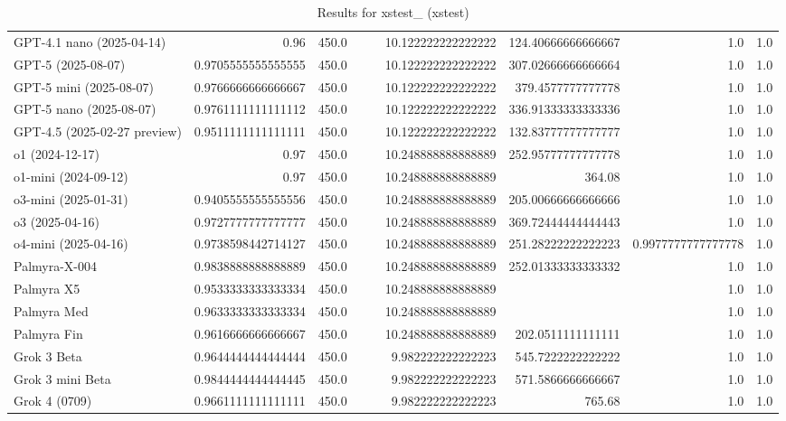 \begin{table}[htp]
{\begin{tabular}{lrrrrrrrr}
GPT-4.1 nano (2025-04-14) & 0.96 & 450.0 &  &  & 10.122222222222222 & 124.40666666666667 & 1.0 & 1.0 \\
GPT-5 (2025-08-07) & 0.9705555555555555 & 450.0 &  &  & 10.122222222222222 & 307.02666666666664 & 1.0 & 1.0 \\
GPT-5 mini (2025-08-07) & 0.9766666666666667 & 450.0 &  &  & 10.122222222222222 & 379.4577777777778 & 1.0 & 1.0 \\
GPT-5 nano (2025-08-07) & 0.9761111111111112 & 450.0 &  &  & 10.122222222222222 & 336.91333333333336 & 1.0 & 1.0 \\
GPT-4.5 (2025-02-27 preview) & 0.9511111111111111 & 450.0 &  &  & 10.122222222222222 & 132.83777777777777 & 1.0 & 1.0 \\
o1 (2024-12-17) & 0.97 & 450.0 &  &  & 10.248888888888889 & 252.95777777777778 & 1.0 & 1.0 \\
o1-mini (2024-09-12) & 0.97 & 450.0 &  &  & 10.248888888888889 & 364.08 & 1.0 & 1.0 \\
o3-mini (2025-01-31) & 0.9405555555555556 & 450.0 &  &  & 10.248888888888889 & 205.00666666666666 & 1.0 & 1.0 \\
o3 (2025-04-16) & 0.9727777777777777 & 450.0 &  &  & 10.248888888888889 & 369.72444444444443 & 1.0 & 1.0 \\
o4-mini (2025-04-16) & 0.9738598442714127 & 450.0 &  &  & 10.248888888888889 & 251.28222222222223 & 0.9977777777777778 & 1.0 \\
Palmyra-X-004 & 0.9838888888888889 & 450.0 &  &  & 10.248888888888889 & 252.01333333333332 & 1.0 & 1.0 \\
Palmyra X5 & 0.9533333333333334 & 450.0 &  &  & 10.248888888888889 &  & 1.0 & 1.0 \\
Palmyra Med & 0.9633333333333334 & 450.0 &  &  & 10.248888888888889 &  & 1.0 & 1.0 \\
Palmyra Fin & 0.9616666666666667 & 450.0 &  &  & 10.248888888888889 & 202.0511111111111 & 1.0 & 1.0 \\
Grok 3 Beta & 0.9644444444444444 & 450.0 &  &  & 9.982222222222223 & 545.7222222222222 & 1.0 & 1.0 \\
Grok 3 mini Beta & 0.9844444444444445 & 450.0 &  &  & 9.982222222222223 & 571.5866666666667 & 1.0 & 1.0 \\
Grok 4 (0709) & 0.9661111111111111 & 450.0 &  &  & 9.982222222222223 & 765.68 & 1.0 & 1.0 \\
\bottomrule
\end{tabular}}
\caption{Results for xstest_ (xstest)}
\label{fig:xstest_ (xstest)}
\end{table}